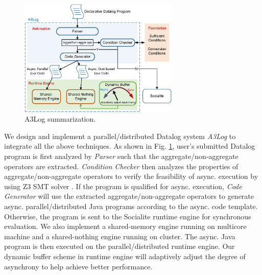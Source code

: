 \begin{figure}[t]
    \centerline{\includegraphics[width=3in]{fig/intro.eps}}
    \caption{A3Log summarization.}
    \label{fig:intro}
\end{figure}


We design and implement a parallel/distributed Datalog system \emph{A3Log} to integrate all the above techniques. As shown in Fig. \ref{fig:intro}, user's submitted Datalog program is first analyzed by \textit{Parser} such that the aggregate/non-aggregate operators are extracted. \textit{Condition Checker} then analyzes the properties of aggregate/non-aggregate operators to verify the feasibility of async. execution by using Z3 SMT solver \cite{}. If the program is qualified for async. execution, \textit{Code Generator} will use the extracted aggregate/non-aggregate operators to generate async. parallel/distributed Java programs according to the async. code template. Otherwise, the program is sent to the Socialite runtime engine for synchronous evaluation. We also implement a shared-memory engine running on multicore machine and a shared-nothing engine running on cluster. The async. Java program is then executed on the parallel/distributed runtime engine. Our dynamic buffer scheme in runtime engine will adaptively adjust the degree of asynchrony to help achieve better performance.


